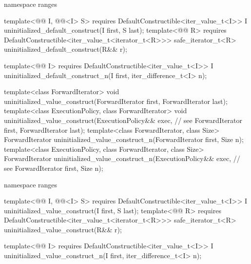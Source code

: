 \begin{addedblock}
\begin{codeblock}
  namespace ranges {
    template<@@ I, @@<I> S>
        requires DefaultConstructible<iter_value_t<I>>
      I uninitialized_default_construct(I first, S last);
    template<@@ R>
        requires DefaultConstructible<iter_value_t<iterator_t<R>>>
      safe_iterator_t<R> uninitialized_default_construct(R&& r);

    template<@@ I>
        requires DefaultConstructible<iter_value_t<I>>
      I uninitialized_default_construct_n(I first, iter_difference_t<I> n);
  }
\end{codeblock}
\end{addedblock}
\begin{codeblock}

  template<class ForwardIterator>
    void uninitialized_value_construct(ForwardIterator first, ForwardIterator last);
  template<class ExecutionPolicy, class ForwardIterator>
    void uninitialized_value_construct(ExecutionPolicy&& exec, // see 
                                       ForwardIterator first, ForwardIterator last);
  template<class ForwardIterator, class Size>
    ForwardIterator uninitialized_value_construct_n(ForwardIterator first, Size n);
  template<class ExecutionPolicy, class ForwardIterator, class Size>
    ForwardIterator uninitialized_value_construct_n(ExecutionPolicy&& exec, // see 
                                                    ForwardIterator first, Size n);
\end{codeblock}
\begin{addedblock}
\begin{codeblock}
  namespace ranges {
    template<@@ I, @@<I> S>
        requires DefaultConstructible<iter_value_t<I>>
      I uninitialized_value_construct(I first, S last);
    template<@@ R>
        requires DefaultConstructible<iter_value_t<iterator_t<R>>>
      safe_iterator_t<R> uninitialized_value_construct(R&& r);

    template<@@ I>
        requires DefaultConstructible<iter_value_t<I>>
      I uninitialized_value_construct_n(I first, iter_difference_t<I> n);
  }
\end{codeblock}
\end{addedblock}
